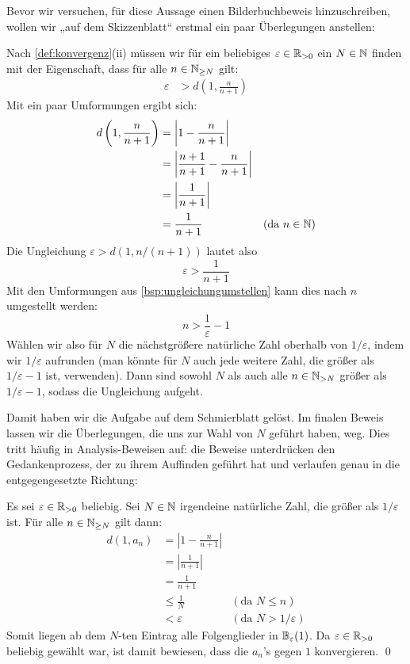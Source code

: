 \begin{bem}
    Bevor wir versuchen, für diese Aussage einen Bilderbuchbeweis hinzuschreiben, wollen wir „auf dem Skizzenblatt“ erstmal ein paar Überlegungen anstellen:
    
    Nach \cref{def:konvergenz}(ii) müssen wir für ein beliebiges $\varepsilon \in \mathbb R_{>0}$ ein $N\in \mathbb N$ finden mit der Eigenschaft, dass für alle $n\in \mathbb N_{\ge N}$ gilt:
    \begin{align*}
        \varepsilon &  > d\left(1,\frac{n}{n+1}\right)
    \end{align*}
    Mit ein paar Umformungen ergibt sich:
    \begin{align*}
        d\left(1,\frac{n}{n+1}\right) & = \left| 1-\frac{n}{n+1}\right| \\
        & = \left| \frac{n+1}{n+1} - \frac{n}{n+1} \right| \\
        & = \left| \frac{1}{n+1}\right| \\
        & = \frac{1}{n+1} & (\text{da $n\in \mathbb N$})
    \end{align*}
    Die Ungleichung $\varepsilon >d(1,n/(n+1))$ lautet also
        \[ \varepsilon > \frac{1}{n+1} \]
    Mit den Umformungen aus \cref{bsp:ungleichungumstellen} kann dies nach $n$ umgestellt werden:
        \[ n > \frac{1}{\varepsilon} -1  \]
    Wählen wir also für $N$ die nächstgrößere natürliche Zahl oberhalb von $1/\varepsilon$, indem wir $1/\varepsilon$ aufrunden (man könnte für $N$ auch jede weitere Zahl, die größer als $1/\varepsilon -1$ ist, verwenden). Dann sind sowohl $N$ als auch alle $n\in \mathbb N_{>N}$ größer als $1/\varepsilon- 1$, sodass die Ungleichung aufgeht.
    
    Damit haben wir die Aufgabe auf dem Schmierblatt gelöst. Im finalen Beweis lassen wir die Überlegungen, die uns zur Wahl von $N$ geführt haben, weg. Dies tritt häufig in Analysis-Beweisen auf: die Beweise unterdrücken den Gedankenprozess, der zu ihrem Auffinden geführt hat und verlaufen genau in die entgegengesetzte Richtung:
\end{bem}


\begin{bew}
    Es sei $\varepsilon \in \mathbb R_{>0}$ beliebig. Sei $N\in \mathbb N$ irgendeine natürliche Zahl, die größer als $1/\varepsilon$ ist. Für alle $n\in \mathbb N_{\ge N}$ gilt dann:
    \begingroup
    \allowdisplaybreaks
    \begin{align*}
        d(1,a_n) & = \left| 1-\frac{n}{n+1}\right| \\
        & = \left| \frac{1}{n+1} \right| \\
        & = \frac{1}{n+1} \\
        & \le \frac{1}{N} & (\text{da $N\le n$})\\
        & < \varepsilon & (\text{da $N> 1/\varepsilon$})
    \end{align*}
    \endgroup
    Somit liegen ab dem $N$-ten Eintrag alle Folgenglieder in $\mathbb B_\varepsilon(1)$. Da $\varepsilon \in \mathbb R_{>0}$ beliebig gewählt war, ist damit bewiesen, dass die $a_n$'s gegen $1$ konvergieren. \qed
\end{bew}


